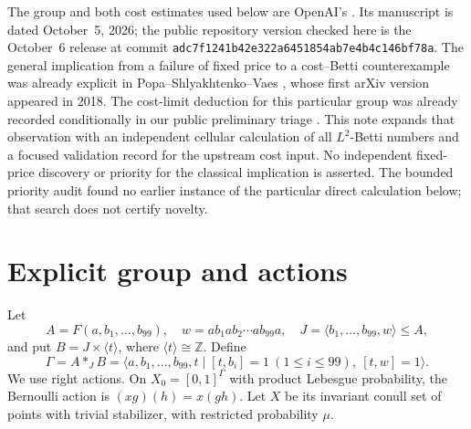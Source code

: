 \documentclass[11pt]{article}
\newcommand{\ZZ}{\mathbb Z}
\theoremstyle{remark}\newtheorem{remark}[theorem]{Remark}
\begin{document}
The group and both cost estimates used below are OpenAI's \cite[Theorem~1.1]{OAI:A-group-without-fixed-price-October-5-2026}. Its manuscript is dated October~5, 2026; the public repository version checked here is the October~6 release at commit \texttt{adc7f1241b42e322a6451854ab7e4b4c146bf78a}. The general implication from a failure of fixed price to a cost--Betti counterexample was already explicit in Popa--Shlyakhtenko--Vaes \cite[Remark~6.6]{psv}, whose first arXiv version appeared in 2018. The cost-limit deduction for this particular group was already recorded conditionally in our public preliminary triage \cite[\S7 and accompanying audit]{triage}. This note expands that observation with an independent cellular calculation of all $L^2$-Betti numbers and a focused validation record for the upstream cost input. No independent fixed-price discovery or priority for the classical implication is asserted. The bounded priority audit found no earlier instance of the particular direct calculation below; that search does not certify novelty.

\section{Explicit group and actions}

Let
\[
 A=F(a,b_1,\ldots,b_{99}),\quad
 w=ab_1ab_2\cdots ab_{99}a,\quad
 J=\langle b_1,\ldots,b_{99},w\rangle\leq A,
\]
and put $B=J\times\langle t\rangle$, where $\langle t\rangle\cong\ZZ$. Define
\begin{equation}\label{eq:group}
 \Gamma=A*_J B
 =\langle a,b_1,\ldots,b_{99},t\mid
          [t,b_i]=1\ (1\leq i\leq99),\ [t,w]=1\rangle.
\end{equation}
We use right actions. On $X_0=[0,1]^\Gamma$ with product Lebesgue probability, the Bernoulli action is $(xg)(h)=x(gh)$. Let $X$ be its invariant conull set of points with trivial stabilizer, with restricted probability $\mu$.
\end{document}
